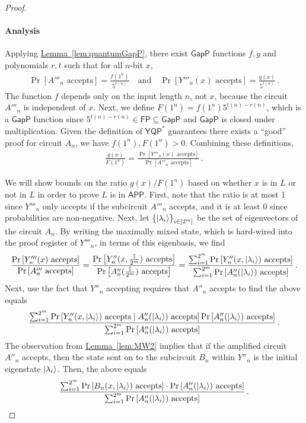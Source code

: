 \documentclass[11pt]{article}
\numberwithin{equation}{section}
\theoremstyle{definition}
\theoremstyle{plain}
\newcommand{\expref}[2]{\hyperref[#2]{#1~\ref{#2}}}
\newcommand{\class}[1]{\ensuremath{\mathsf{#1}}\xspace}
\newcommand{\GapP}{\class{GapP}}
\newcommand{\YQPstar}{\class{YQP^*}}
\newcommand{\APP}{\class{APP}}
\newcommand{\bbI}{\mathbb{I}}
\begin{document}
\begin{proof}
	\paragraph{Analysis}
	Applying \expref{Lemma}{lem:quantumGapP}, there exist $\GapP$ functions $f,g$ and polynomials
	$r,t$ such that for all $n$-bit $x$,
	\begin{gather*}
		\Pr\left[A'''_n\text{ accepts}\right] = \frac{f(1^n)}{5^{r(n)}}
		\quad\text{and}\quad
		\Pr\left[Y'''_n(x)\text{ accepts}\right] = \frac{g(x)}{5^{t(n)}} \, .
	\end{gather*}
	The function $f$ depends only on the input length $n$, not $x$,
	because the circuit $A'''_n$ is independent of $x$.
	Next, we define $F(1^n) = f(1^n) 5^{t(n)-r(n)}$, which is a $\GapP$ function
	since $5^{t(n)-r(n)}\in \class{FP}\subseteq \GapP$ and $\GapP$ is closed under
	multiplication.
	Given the definition of $\YQPstar$ guarantees there
	exists a ``good'' proof for circuit $A_n$,
	we have  $f(1^n),F(1^n)>0$.
	Combining these definitions,
	\begin{gather*}
		\frac{g(x)}{F(1^n)} =
		\frac{\Pr\left[Y'''_n(x)\text{ accepts}\right]}
		{\Pr\left[A'''_n\text{ accepts}\right] } \, .
	\end{gather*}
	
	We will show bounds on the ratio $g(x)/F(1^n)$ based on whether $x$ is in $L$ or
	not in $L$ in order to prove $L$ is in $\APP$.
	First, note that the ratio is
 at most %
 1 since $Y'''_n$ only accepts if the subcircuit $A'''_n$ accepts,
 and it is %
 at least %
0 since probabilities are non-negative.
	Next, let $\left\{\ket{\lambda_i}\right\}_{i\in[2^m]}$ be the set of
	eigenvectors of the circuit $A_n$.
	By writing the maximally mixed state, which is hard-wired into the proof register of
	$Y'''_n$,
	in terms of this eigenbasis, we find
	\[
		\frac{\Pr\left[Y'''_n(x)\text{ accepts}\right]}
		{\Pr\left[A'''_n\text{ accepts}\right]}
		= \frac{\Pr\left[Y''_n(x,\frac{\bbI}{2^m})\text{ accepts}\right]}
		{\Pr\left[A''_n(\frac{\bbI}{2^m})\text{ accepts}\right]}
		= \frac{\sum_{i=1}^{2^{m}}
			\Pr\left[Y''_n(x,\ket{\lambda_i})\text{ accepts}\right]}
		{\sum_{i=1}^{2^{m}} \Pr\left[A''_n(\ket{\lambda_i})
			\text{ accepts}\right]} \, .
	\]
	Next, use the fact that $Y''_n$ accepting requires that
	$A''_n$ accepts to find the above equals
	\[
		\frac{\sum_{i=1}^{2^{m}}
		\Pr\left[Y''_n(x,\ket{\lambda_i})\text{ accepts}
		\mid A''_n(\ket{\lambda_i})\text{ accepts} \right]
		\Pr\left[A''_n(\ket{\lambda_i})\text{ accepts}\right]}
		{\sum_{i=1}^{2^{m}} \Pr\left[A''_n(\ket{\lambda_i})
		\text{ accepts}\right]}  \, .
	\]
	The observation from \expref{Lemma}{lem:MW2}
	implies	that if the amplified circuit $A''_n$ %
	accepts, then %
	the state sent on to the subcircuit $B_n$ within $Y''_n$ is 
the initial eigenstate $\ket{\lambda_i}$.
	Then, the above equals
	\[
		\frac{\sum_{i=1}^{2^{m}}
			\Pr\left[B_n(x,\ket{\lambda_i})\text{ accepts}\right]
			\cdot \Pr\left[A''_n(\ket{\lambda_i})\text{ accepts}\right]}
		{\sum_{i=1}^{2^{m}} \Pr\left[A''_n(\ket{\lambda_i})
			\text{ accepts}\right]} \, .
	\]


\end{proof}
\end{document}
